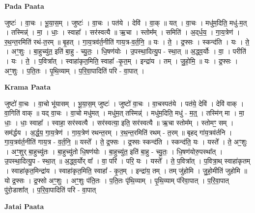 \documentclass[17pt]{extarticle}
\begin{document}
\textbf{Pada Paata} \newline

जुष्टः॑ । वा॒चः । भू॒या॒स॒म् । जुष्टः॑ । वा॒चः । पत॑ये । देवि॑ । वा॒क् ॥ यत् । वा॒चः । मधु॑म॒दिति॒ मधु॑-म॒त् । तस्मिन्न्॑ । मा॒ । धाः॒ । स्वाहा᳚ । सर॑स्वत्यै ॥ ऋ॒चा । स्तोम᳚म् । समिति॑ । अ॒द्‌र्ध॒य॒ । गा॒य॒त्रेण॑ । र॒थ॒न्त॒रमिति॑ रथं-त॒रम् ॥ बृ॒हत् । गा॒य॒त्रव॑र्त॒नीति॑ गाय॒त्र-व॒र्त॒नि॒ ॥ यः । ते॒ । द्र॒फ्सः । स्कन्द॑ति । यः । ते॒ । अꣳ॒॒शुः । बा॒हुच्यु॑त॒ इति॑ बा॒हु - च्यु॒तः॒ । धि॒षण॑योः । उ॒पस्था॒दित्यु॒प - स्था॒त् ॥ अ॒द्ध्व॒र्योः । वा॒ । परीति॑ । यः । ते॒ । प॒वित्रा᳚त् । स्वाहा॑कृत॒मिति॒ स्वाहा᳚ -कृ॒त॒म् । इन्द्रा॑य । तम् । जु॒हो॒मि॒ ॥ यः । द्र॒फ्सः । अꣳ॒॒शुः । प॒ति॒तः । पृ॒थि॒व्याम् । प॒रि॒वा॒पादिति॑ परि - वा॒पात् ।  \newline


\textbf{Krama Paata} \newline

जुष्टो॑ वा॒चः । वा॒चो भू॑यासम् । भू॒या॒स॒म् जुष्टः॑ । जुष्टो॑ वा॒चः । वा॒चस्पत॑ये । पत॑ये॒ देवि॑ । देवि॑ वाक् । वा॒गिति॑ वाक् ॥ यद् वा॒चः । वा॒चो मधु॑मत् । मधु॑म॒त् तस्मिन्न्॑ । मधु॑म॒दिति॒ मधु॑ - म॒त्॒ । तस्मि॑न् मा । मा॒ धाः॒ । धाः॒ स्वाहा᳚ । स्वाहा॒ सर॑स्वत्यै । सर॑स्वत्या॒ इति॒ सर॑स्वत्यै ॥ ऋ॒चा स्तोम᳚म् । स्तोमꣳ॒॒ सम् । सम॑र्द्धय । अ॒र्द्ध॒य॒ गा॒य॒त्रेण॑ । गा॒य॒त्रेण॑ रथन्त॒रम् । र॒थ॒न्त॒रमिति॑ रथम् - त॒रम् ॥ बृहद् गा॑य॒त्रव॑र्तनि । गा॒य॒त्रव॑र्त॒नीति॑ गाय॒त्र - व॒र्त॒नि॒ ॥ यस्ते᳚ । ते॒ द्र॒फ्सः । द्र॒फ्सः स्कन्द॑ति । स्कन्द॑ति॒ यः । यस्ते᳚ । ते॒ अꣳ॒॒शुः । अꣳ॒॒शुर् बा॒हुच्यु॑तः । बा॒हुच्यु॑तो धि॒षण॑योः । बा॒हुच्यु॑त॒ इति॑ बा॒हु - च्यु॒तः॒ । धि॒षण॑योरु॒पस्था᳚त् । उ॒पस्था॒दित्यु॒प - स्था॒त् ॥ अ॒द्ध्व॒र्योर् वा᳚ । वा॒ परि॑ । परि॒ यः । यस्ते᳚ । ते॒ प॒वित्रा᳚त् । प॒वित्रा॒थ् स्वाहा॑कृतम् । स्वाहा॑कृत॒मिन्द्रा॑य । स्वाहा॑कृत॒मिति॒ स्वाहा᳚ - कृ॒त॒म् । इन्द्रा॑य॒ तम् । तम् जु॑होमि । जु॒हो॒मीति॑ जुहोमि ॥ यो द्र॒फ्सः । द्र॒फ्सो अꣳ॒॒शुः । अꣳ॒॒शुः प॑ति॒तः । प॒ति॒तः पृ॑थि॒व्याम् । पृ॒थि॒व्याम् प॑रिवा॒पात् । प॒रि॒वा॒पात् पु॑रो॒डाशा᳚त् । प॒रि॒वा॒पादिति॑ परि - वा॒पात् \newline

\textbf{Jatai Paata} \newline
\end{document}
